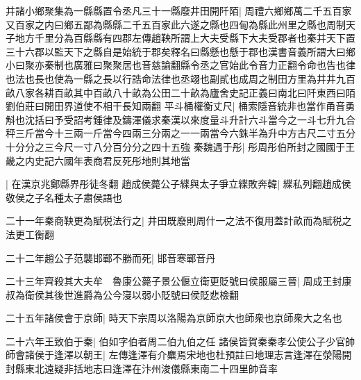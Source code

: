 并諸小鄉聚集為一縣縣置令丞凡三十一縣廢井田開阡陌|{
	周禮六鄉鄉萬二千五百家又百家之内曰鄉五鄙為縣縣二千五百家此六遂之縣也四甸為縣此州里之縣也周制天子地方千里分為百縣縣有四郡左傳趙鞅所謂上大夫受縣下大夫受郡者也秦并天下置三十六郡以監天下之縣自是始統于郡矣釋名曰縣懸也懸于郡也漢書音義所謂大曰鄉小曰聚亦秦制也廣雅曰聚聚居也音慈諭翻縣令丞之官始此令音力正翻令命也告也律也法也長也使為一縣之長以行誥命法律也丞翊也副貳也成周之制田方里為井井九百畝八家各耕百畝其中百畝八十畝為公田二十畝為廬舍史記正義曰南北曰阡東西曰陌劉伯莊曰開田界道使不相干長知兩翻}
平斗桶權衡丈尺|{
	桶索隱音統非也當作甬音勇斛也沈括曰予受詔考鍾律及鑄渾儀求秦漢以來度量斗升計六斗當今之一斗七升九合秤三斤當今十三兩一斤當今四兩三分兩之一一兩當今六銖半為升中方古尺二寸五分十分分之三今尺一寸八分百分分之四十五強}
秦魏遇于彤|{
	彤周彤伯所封之國國于王畿之内史記六國年表商君反死彤地則其地當}


|{
	在漢京兆鄭縣界彤徒冬翻}
趙成侯薨公子緤與太子爭立緤敗奔韓|{
	緤私列翻趙成侯敬侯之子名種太子肅侯語也}


二十一年秦商鞅更為賦税法行之|{
	井田既廢則周什一之法不復用蓋計畝而為賦税之法更工衡翻}


二十二年趙公子范襲邯鄲不勝而死|{
	邯音寒鄲音丹}


二十三年齊殺其大夫牟　魯康公薨子景公偃立衛更貶號曰侯服屬三晉|{
	周成王封康叔為衛侯其後世進爵為公今寖以弱小貶號曰侯貶悲檢翻}


二十五年諸侯會于京師|{
	時天下宗周以洛陽為京師京大也師衆也京師衆大之名也}


二十六年王致伯于秦|{
	伯如字伯者周二伯九伯之任}
諸侯皆賀秦秦孝公使公子少官帥師會諸侯于逢澤以朝王|{
	左傳逢澤有介麋焉宋地也杜預註曰地理志言逢澤在滎陽開封縣東北遠疑非括地志曰逢澤在汴州浚儀縣東南二十四里帥音率}


